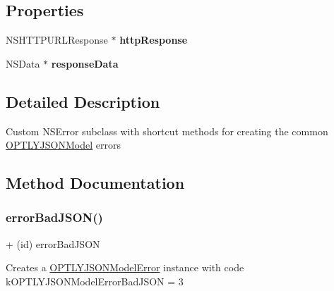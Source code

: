 \subsection*{Properties}
\begin{DoxyCompactItemize}
\item 
\mbox{\label{interface_o_p_t_l_y_j_s_o_n_model_error_ade8a43347897aa1512cc65736f55fd16}} 
N\+S\+H\+T\+T\+P\+U\+R\+L\+Response $\ast$ {\bfseries http\+Response}
\item 
\mbox{\label{interface_o_p_t_l_y_j_s_o_n_model_error_a7eb97cbc0761dc5f8f64cd0878dcc648}} 
N\+S\+Data $\ast$ {\bfseries response\+Data}
\end{DoxyCompactItemize}


\subsection{Detailed Description}
Custom N\+S\+Error subclass with shortcut methods for creating the common \mbox{\hyperlink{interface_o_p_t_l_y_j_s_o_n_model}{O\+P\+T\+L\+Y\+J\+S\+O\+N\+Model}} errors 

\subsection{Method Documentation}
\mbox{\label{interface_o_p_t_l_y_j_s_o_n_model_error_a2a82b06b93c814ad35c2cf018d2e6593}} 
\subsubsection{\texorpdfstring{error\+Bad\+J\+S\+O\+N()}{errorBadJSON()}}
{\footnotesize\ttfamily + (id) error\+Bad\+J\+S\+ON \begin{DoxyParamCaption}{ }\end{DoxyParamCaption}}

Creates a \mbox{\hyperlink{interface_o_p_t_l_y_j_s_o_n_model_error}{O\+P\+T\+L\+Y\+J\+S\+O\+N\+Model\+Error}} instance with code k\+O\+P\+T\+L\+Y\+J\+S\+O\+N\+Model\+Error\+Bad\+J\+S\+ON = 3 \mbox{\label{interface_o_p_t_l_y_j_s_o_n_model_error_ab4eabf59d3e50681aec28696519a2861}} 
